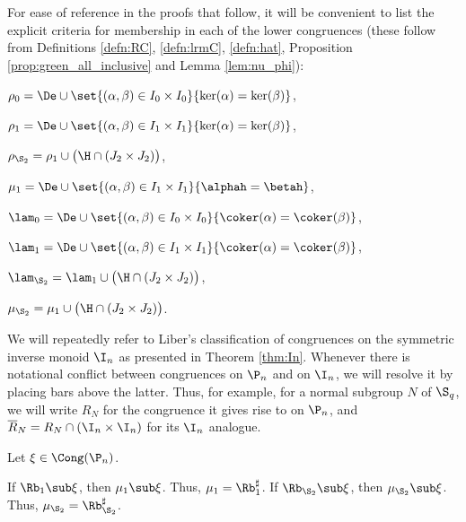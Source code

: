  

  




%
For ease of reference in the proofs that follow, it will be convenient to list the explicit criteria for membership in each of the lower congruences (these follow from Definitions \ref{defn:RC}, \ref{defn:lrmC}, \ref{defn:hat}, Proposition \ref{prop:green_all_inclusive} and Lemma \ref{lem:nu_phi}):
\begin{itemize}\begin{multicols}{2}
\item $\rho_0=\De \cup \set{(\alpha,\beta)\in I_0\times I_0}{\ker(\alpha)=\ker(\beta)}$,

\item $\rho_1=\De \cup \set{(\alpha,\beta)\in I_1\times I_1}{\ker(\alpha)=\ker(\beta)}$,

\item $\rho_{\S_2}=\rho_1\cup\big( {\H}\cap(J_2\times J_2)\big)$,

\item $\mu_1= \De \cup \set{(\alpha,\beta)\in I_1\times I_1}{\alphah=\betah}$,

\item $\lam_0=\De \cup \set{(\alpha,\beta)\in I_0\times I_0}{\coker(\alpha)=\coker(\beta)}$,

\item $\lam_1=\De \cup \set{(\alpha,\beta)\in I_1\times I_1}{\coker(\alpha)=\coker(\beta)}$,

\item $\lam_{\S_2}=\lam_1\cup\big( {\H}\cap(J_2\times J_2)\big)$,

\item $\mu_{\S_2}=\mu_1\cup\big( {\H}\cap(J_2\times J_2)\big)$.
\end{multicols}\end{itemize}
%
We will repeatedly refer to Liber's classification of congruences on the symmetric inverse monoid $\I_n$ as presented in Theorem \ref{thm:In}.
Whenever there is notational conflict between congruences on $\P_n$ and on $\I_n$, we will resolve it by placing bars above the latter.
Thus, for example, for a normal subgroup $N$ of $\S_q$, we will write $R_N$ for the congruence it gives rise to on $\P_n$, and $\overline{R}_N=R_N\cap (\I_n\times\I_n)$ for its $\I_n$ analogue.



\begin{lemma}\label{lem:mn}
Let $\xi\in\Cong(\P_n)$.
\begin{itemize}
\begin{multicols}{2}
  If $\Rb_1\sub\xi$, then $\mu_1\sub\xi$.  Thus, $\mu_1=\Rb_1^\sharp$.
  If $\Rb_{\S_2}\sub\xi$, then $\mu_{\S_2}\sub\xi$.  Thus, $\mu_{\S_2}=\Rb_{\S_2}^\sharp$.
\end{multicols}
\end{itemize}
\end{lemma}


